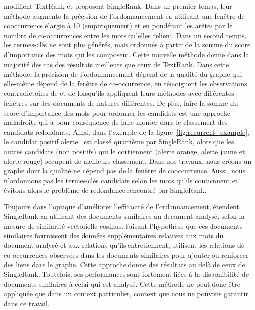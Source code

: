      modifient TextRank et proposent SingleRank. Dans
    un premier temps, leur méthode augmente la précision de l'ordonnancement en
    utilisant une fenêtre de cooccurrence élargie à 10 (empiriquement) et en
    pondérant les arêtes par le nombre de co-occurrences entre les mots qu'elles
    relient. Dans un second temps, les termes-clés ne sont plus générés, mais
    ordonnés à partir de la somme du score d'importance des mots qui les
    composent. Cette nouvelle méthode donne dans la majorité des cas des
    résultats meilleurs que ceux de TextRank. Dans cette méthode, la précision
    de l'ordonnancement dépend de la qualité du graphe qui elle-même dépend de
    la fenêtre de co-occurrence, en témoignent les observations contradictoires
    de  et de 
    lorsqu'ils appliquent leurs méthodes avec différentes fenêtres sur des
    documents de natures différentes. De plus, faire la somme du score
    d'importance des mots pour ordonner les candidats est une approche
    maladroite qui a pour conséquence de faire monter dans le classement des
    candidats redondants. Ainsi, dans l'exemple de la
    figure~\ref{fig:recurrent_example}, le candidat positif \og{}alerte~\fg{}
    est classé quatrième par SingleRank, alors que les autres candidats (non
    positifs) qui le contiennent (\og{}alerte orange\fg{}, \og{}alerte
    jaune\fg{} et \og{}alerte rouge\fg{}) occupent de meilleurs classement. Dans
    nos travaux, nous créons un graphe dont la qualité ne dépend pas de la
    fenêtre de cooccurrence. Aussi, nous n'ordonnons pas les termes-clés
    candidats selon les mots qu'ils contiennent et évitons alors le problème de
    redondance rencontré par SingleRank.

    Toujours dans l'optique d'améliorer l'efficacité de l'ordonnancement,
     étendent SingleRank en utilisant des documents
    similaires au document analysé, selon la mesure de similarité vectorielle
    cosinus. Faisant l'hypothèse que ces documents similaires fournissent des
    données supplémentaires relatives aux mots du document analysé et aux
    relations qu'ils entretiennent,  utilisent les
    relations de co-occurrences observées dans les documents similaires pour
    ajouter ou renforcer des liens dans le graphe. Cette approche donne des
    résultats au delà de ceux de SingleRank. Toutefois, ses performances sont
    fortement liées à la disponibilité de documents similaires à celui qui est
    analysé. Cette méthode ne peut donc être appliquée que dans un context
    particulier, context que nous ne pouvons garantir dans ce travail.

